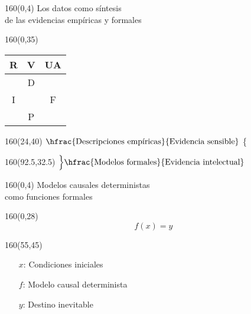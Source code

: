 \documentclass[shownotes,aspectratio=169]{beamer}
\begin{document}
\begin{frame}[plain]
\begin{textblock}{160}(0,4)
 \centering \LARGE
 Los datos como síntesis \\ \Large de las evidencias empíricas y formales
\end{textblock}
\vspace{0.75cm}

\begin{textblock}{160}(0,35)
\centering
\begin{tabular}{ccc}
R &    \multicolumn{1}{|c}{V}  &  \multicolumn{1}{|c}{UA} \\ \hline
   &  \multicolumn{1}{|c}{D}      & \multicolumn{1}{|c}{} \\
                 I  &   & F \\
 & \multicolumn{1}{|c}{P}  &      \multicolumn{1}{|c}{} 
 \end{tabular}
\end{textblock}

\begin{textblock}{160}(24,40)
$\hfrac{\text{\normalsize Descripciones empíricas}}{\text{\normalsize Evidencia sensible}}$  \Bigg\{
\end{textblock}

\begin{textblock}{160}(92.5,32.5)
$\Big\} \hfrac{\text{\normalsize Modelos formales}}{\text{\normalsize Evidencia intelectual}}$
\end{textblock}




 \end{frame}


\begin{frame}[plain]
 \begin{textblock}{160}(0,4)
 \centering \LARGE
 Modelos causales deterministas \\  \Large como funciones formales
\end{textblock}
\vspace{0.75cm}


\begin{textblock}{160}(0,28)
\begin{equation*}
 f(x) = y
\end{equation*}
\end{textblock}

\begin{textblock}{160}(55,45)
\centering
\begin{itemize}
 \item[$x$:] 
    {Condiciones iniciales} 
 \item[$f$:] 
    {Modelo causal determinista}
 \item[$y$:] 
    {Destino inevitable}
\end{itemize}
\end{textblock}



\end{frame}
\end{document}
